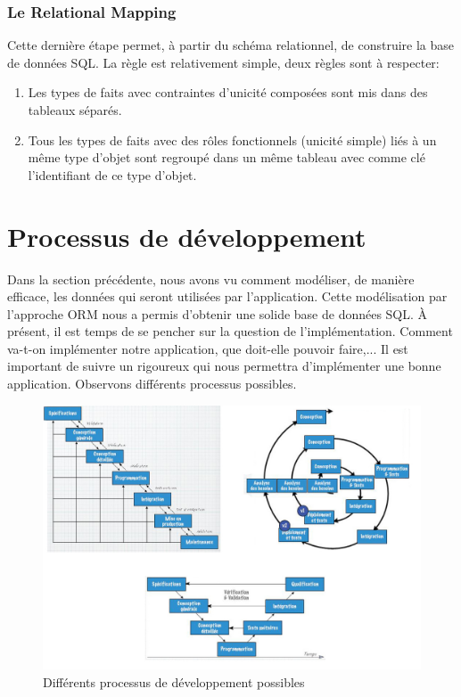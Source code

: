 \section{Le Relational Mapping}
Cette dernière étape permet, à partir du schéma relationnel,
de construire la base de données SQL.
La règle est relativement simple, deux règles sont à respecter:
\begin{enumerate}
  \item Les types de faits avec contraintes d'unicité composées
    sont mis dans des tableaux séparés.
  \item Tous les types de faits avec des rôles fonctionnels (unicité simple)
    liés à un même type d'objet sont regroupé dans un même tableau
    avec comme clé l'identifiant de ce type d'objet.
\end{enumerate}

\part{Processus de développement}
Dans la section précédente, nous avons vu comment modéliser,
de manière efficace, les données qui seront utilisées par l'application.
Cette modélisation par l'approche ORM nous a permis d'obtenir une solide
base de données SQL.
À présent, il est temps de se pencher sur la question de l'implémentation.
Comment va-t-on implémenter notre application, que doit-elle pouvoir faire,...
Il est important de suivre un 
rigoureux qui nous permettra d'implémenter une bonne application.
Observons différents processus possibles.

\begin{figure}[h]
  \centering
  \includegraphics[scale=0.58]{processus_developpement_example.jpg}
  \caption{Différents processus de développement possibles}
  \label{processus_developpement_example}
\end{figure}

